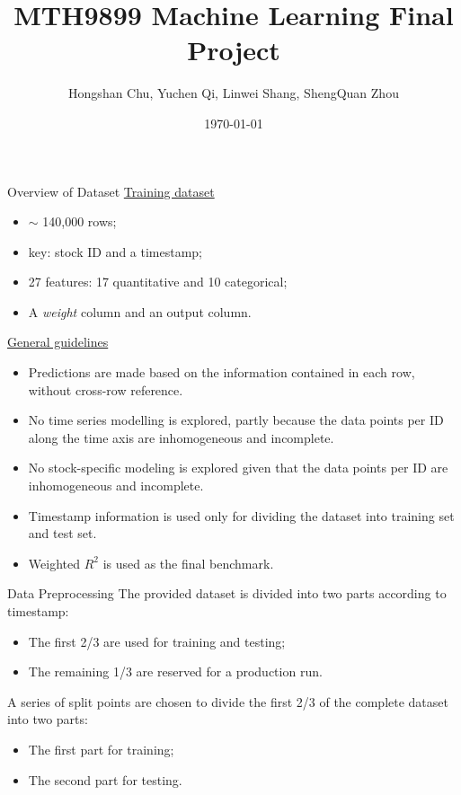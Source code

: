 \documentclass{beamer}
\title[MTH9899 Machine Learning]{MTH9899 Machine Learning Final Project}
\author[H.Chu, Y.Qi, L.Shang, S.Q.Zhou]{Hongshan Chu, Yuchen Qi, Linwei Shang, ShengQuan Zhou} %
\institute[Baruch] 
{
Baruch MFE \\ %
}
\date{\today} %
\begin{document}
\begin{frame}
\titlepage %
\end{frame}



\begin{frame}{Overview of Dataset}
\underline{Training dataset}
\begin{itemize}[noitemsep]
\item $\sim$ 140,000 rows;
\item key: stock ID and a timestamp;
\item 27 features: 17 quantitative and 10 categorical;
\item A \textit{weight} column and an output column.
\end{itemize}
\underline{General guidelines}
\begin{itemize}[noitemsep]
\item Predictions are made based on the information contained in each row, without cross-row reference.
\item No time series modelling is explored, partly because the data points per ID along the time axis are inhomogeneous and incomplete.
\item No stock-specific modeling is explored given that the data points per ID are inhomogeneous and incomplete.
\item Timestamp information is used only for dividing the dataset into training set and test set.
\item Weighted $R^2$ is used as the final benchmark.
\end{itemize}
\end{frame}

\begin{frame}{Data Preprocessing}
The provided dataset is divided into two parts according to timestamp:
\begin{itemize}[noitemsep]
\item The first 2/3 are used for training and testing;
\item The remaining 1/3 are reserved for a production run.
\end{itemize}
A series of split points are chosen to divide the first 2/3 of the complete dataset into two parts:
\begin{itemize}[noitemsep]
\item The first part for training;
\item The second part for testing.
\end{itemize}
\end{frame}
\end{document}
